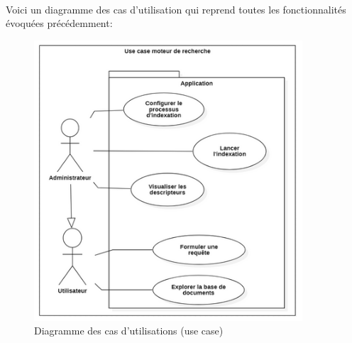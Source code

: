 \documentclass[../main.tex]{subfiles}
\begin{document}
    \paragraph{}
    Voici un diagramme des cas d’utilisation qui reprend toutes les fonctionnalités évoquées précédemment:

    \begin{figure}[h]
        \centering
        \includegraphics[width=100mm]{diagrams/user_interactions.png}
        \caption{Diagramme des cas d'utilisations (use case)}
    \end{figure}
\end{document}
